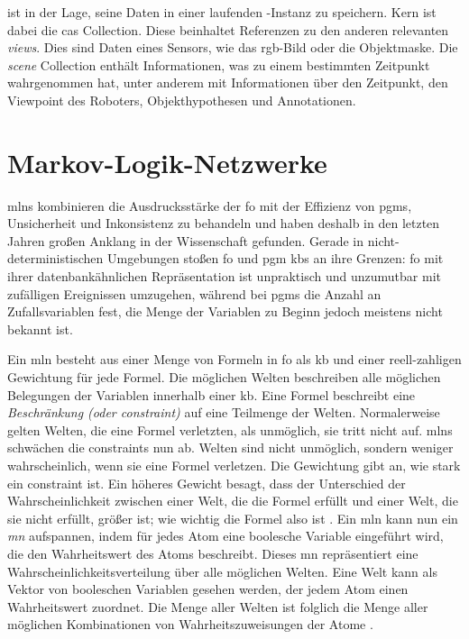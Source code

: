 \robosherlock ist in der Lage, seine Daten in einer laufenden \mongodb-Instanz zu speichern. Kern ist dabei die \gls{cas} Collection. Diese beinhaltet Referenzen zu den anderen relevanten \textit{views}. Dies sind Daten eines Sensors, wie das \gls{rgb}-Bild oder die Objektmaske. Die \textit{scene} Collection enthält Informationen, was \robosherlock zu einem bestimmten Zeitpunkt wahrgenommen hat, unter anderem mit Informationen über den Zeitpunkt, den Viewpoint des Roboters, Objekthypothesen und Annotationen. \cite{episodicMemory}



\section{Markov-Logik-Netzwerke}
\label{sec:mln}
\glspl{mln} kombinieren die Ausdrucksstärke der \gls{fo} mit der Effizienz von \glspl{pgm}, Unsicherheit und Inkonsistenz zu behandeln und haben deshalb in den letzten Jahren großen Anklang in der Wissenschaft gefunden. Gerade in nicht-deterministischen Umgebungen stoßen \gls{fo} und \gls{pgm} \glspl{kb} an ihre Grenzen: \gls{fo} mit ihrer datenbankähnlichen Repräsentation ist unpraktisch und unzumutbar mit zufälligen Ereignissen umzugehen, während bei \glspl{pgm} die Anzahl an Zufallsvariablen fest, die Menge der Variablen zu Beginn jedoch meistens nicht bekannt ist. \cite{nyga17} \par 

Ein \gls{mln} besteht aus einer Menge von Formeln in \gls{fo} als \acrlong{kb} und einer reell-zahligen Gewichtung für jede Formel. Die möglichen Welten beschreiben alle möglichen Belegungen der Variablen innerhalb einer \gls{kb}. Eine Formel beschreibt eine \textit{Beschränkung (oder constraint)} auf eine Teilmenge der Welten. Normalerweise gelten Welten, die eine Formel verletzten, als unmöglich, sie tritt nicht auf. \glspl{mln} schwächen die constraints nun ab. Welten sind nicht unmöglich, sondern weniger wahrscheinlich, wenn sie eine Formel verletzen. Die Gewichtung gibt an, wie stark ein constraint ist. Ein höheres Gewicht besagt, dass der Unterschied der Wahrscheinlichkeit zwischen einer Welt, die die Formel erfüllt und einer Welt, die sie nicht erfüllt, größer ist; wie wichtig die Formel also ist \cite{mln}. Ein \gls{mln} kann nun ein \textit{\gls{mn}} aufspannen, indem für jedes Atom eine boolesche Variable eingeführt wird, die den Wahrheitswert des Atoms beschreibt. Dieses \gls{mn} repräsentiert eine Wahrscheinlichkeitsverteilung über alle möglichen Welten. Eine Welt kann als Vektor von booleschen Variablen gesehen werden, der jedem Atom einen Wahrheitswert zuordnet. Die Menge aller Welten ist folglich die Menge aller möglichen Kombinationen von Wahrheitszuweisungen der Atome \cite{nyga17}. \par

